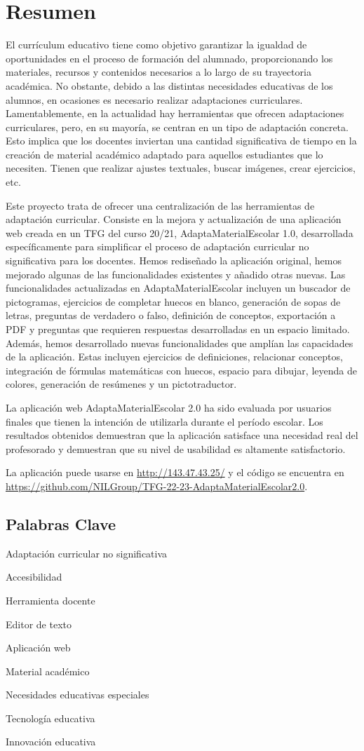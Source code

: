 \chapter*{Resumen}

El currículum educativo tiene como objetivo garantizar la igualdad de oportunidades en el proceso de formación del alumnado, proporcionando los materiales, recursos y contenidos necesarios a lo largo de su trayectoria académica. No obstante, debido a las distintas necesidades educativas de los alumnos, en ocasiones es necesario realizar adaptaciones curriculares. Lamentablemente, en la actualidad hay herramientas que ofrecen adaptaciones curriculares, pero, en su mayoría, se centran en un tipo de adaptación concreta. Esto implica que los docentes inviertan una cantidad significativa de tiempo en la creación de material académico adaptado para aquellos estudiantes que lo necesiten. Tienen que realizar ajustes textuales, buscar imágenes, crear ejercicios, etc.

Este proyecto trata de ofrecer una centralización de las herramientas de adaptación curricular. Consiste en la mejora y actualización de una aplicación web creada en un TFG del curso 20/21, AdaptaMaterialEscolar 1.0, desarrollada específicamente para simplificar el proceso de adaptación curricular no significativa para los docentes. Hemos rediseñado la aplicación original, hemos mejorado algunas de las funcionalidades existentes y añadido otras nuevas. Las funcionalidades actualizadas en AdaptaMaterialEscolar incluyen un buscador de pictogramas, ejercicios de completar huecos en blanco, generación de sopas de letras, preguntas de verdadero o falso, definición de conceptos, exportación a PDF y preguntas que requieren respuestas desarrolladas en un espacio limitado. Además, hemos desarrollado nuevas funcionalidades que amplían las capacidades de la aplicación. Estas incluyen ejercicios de definiciones, relacionar conceptos, integración de fórmulas matemáticas con huecos, espacio para dibujar, leyenda de colores, generación de resúmenes y un pictotraductor.

La aplicación web AdaptaMaterialEscolar 2.0 ha sido evaluada por usuarios finales que tienen la intención de utilizarla durante el período escolar. Los resultados obtenidos demuestran que la aplicación satisface una necesidad real del profesorado y demuestran que su nivel de usabilidad es altamente satisfactorio.

La aplicación puede usarse en \url{http://143.47.43.25/} y el código se encuentra en \url{https://github.com/NILGroup/TFG-22-23-AdaptaMaterialEscolar2.0}.

\section*{Palabras Clave}

Adaptación curricular no significativa

Accesibilidad

Herramienta docente

Editor de texto

Aplicación web

Material académico

Necesidades educativas especiales

Tecnología educativa

Innovación educativa



